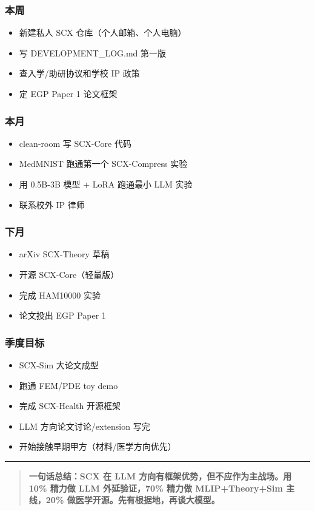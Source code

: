 \documentclass[
  12pt,
]{ctexart}
\providecommand{\tightlist}{%
  \setlength{\itemsep}{0pt}\setlength{\parskip}{0pt}}
\begin{document}
\subsubsection{本周}\label{ux672cux5468}

\begin{itemize}
\tightlist
\item[$\square$]
  新建私人 SCX 仓库（个人邮箱、个人电脑）
\item[$\square$]
  写 DEVELOPMENT\_LOG.md 第一版
\item[$\square$]
  查入学/助研协议和学校 IP 政策
\item[$\square$]
  定 EGP Paper 1 论文框架
\end{itemize}

\subsubsection{本月}\label{ux672cux6708}

\begin{itemize}
\tightlist
\item[$\square$]
  clean-room 写 SCX-Core 代码
\item[$\square$]
  MedMNIST 跑通第一个 SCX-Compress 实验
\item[$\square$]
  用 0.5B-3B 模型 + LoRA 跑通最小 LLM 实验
\item[$\square$]
  联系校外 IP 律师
\end{itemize}

\subsubsection{下月}\label{ux4e0bux6708}

\begin{itemize}
\tightlist
\item[$\square$]
  arXiv SCX-Theory 草稿
\item[$\square$]
  开源 SCX-Core（轻量版）
\item[$\square$]
  完成 HAM10000 实验
\item[$\square$]
  论文投出 EGP Paper 1
\end{itemize}

\subsubsection{季度目标}\label{ux5b63ux5ea6ux76eeux6807}

\begin{itemize}
\tightlist
\item[$\square$]
  SCX-Sim 大论文成型
\item[$\square$]
  跑通 FEM/PDE toy demo
\item[$\square$]
  完成 SCX-Health 开源框架
\item[$\square$]
  LLM 方向论文讨论/extension 写完
\item[$\square$]
  开始接触早期甲方（材料/医学方向优先）
\end{itemize}

\begin{center}\rule{0.5\linewidth}{0.5pt}\end{center}

\begin{quote}
\textbf{一句话总结：SCX 在 LLM 方向有框架优势，但不应作为主战场。用 10\%
精力做 LLM 外延验证，70\% 精力做 MLIP+Theory+Sim 主线，20\%
做医学开源。先有根据地，再谈大模型。}
\end{quote}
\end{document}
